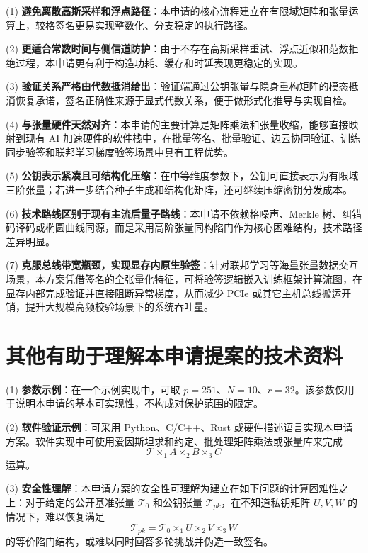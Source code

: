 \documentclass[12pt,a4paper]{article}
\begin{document}
(1) \textbf{避免离散高斯采样和浮点路径}：本申请的核心流程建立在有限域矩阵和张量运算上，较格签名更易实现整数化、分支稳定的执行路径。

(2) \textbf{更适合常数时间与侧信道防护}：由于不存在高斯采样重试、浮点近似和范数拒绝过程，本申请更有利于构造功耗、缓存和时延表现更稳定的实现。

(3) \textbf{验证关系严格由代数抵消给出}：验证端通过公钥张量与隐身重构矩阵的模态抵消恢复承诺，签名正确性来源于显式代数关系，便于做形式化推导与实现自检。

(4) \textbf{与张量硬件天然对齐}：本申请的主要计算是矩阵乘法和张量收缩，能够直接映射到现有 AI 加速硬件的软件栈中，在批量签名、批量验证、边云协同验证、训练同步验签和联邦学习梯度验签场景中具有工程优势。

(5) \textbf{公钥表示紧凑且可结构化压缩}：在中等维度参数下，公钥可直接表示为有限域三阶张量；若进一步结合种子生成和结构化矩阵，还可继续压缩密钥分发成本。

(6) \textbf{技术路线区别于现有主流后量子路线}：本申请不依赖格噪声、Merkle 树、纠错码译码或椭圆曲线同源，而是采用高阶张量同构陷门作为核心困难结构，技术路径差异明显。

(7) \textbf{克服总线带宽瓶颈，实现显存内原生验签}：针对联邦学习等海量张量数据交互场景，本方案凭借签名的全张量化特征，可将验签逻辑嵌入训练框架计算流图，在显存内部完成验证并直接阻断异常梯度，从而减少 PCIe 或其它主机总线搬运开销，提升大规模高频校验场景下的系统吞吐量。

\section{其他有助于理解本申请提案的技术资料}

(1) \textbf{参数示例}：在一个示例实现中，可取 $p=251$、$N=10$、$r=32$。该参数仅用于说明本申请的基本可实现性，不构成对保护范围的限定。

(2) \textbf{软件验证示例}：可采用 Python、C/C++、Rust 或硬件描述语言实现本申请方案。软件实现中可使用爱因斯坦求和约定、批处理矩阵乘法或张量库来完成
\[
\mathcal{T} \times_1 A \times_2 B \times_3 C
\]
运算。

(3) \textbf{安全性理解}：本申请方案的安全性可理解为建立在如下问题的计算困难性之上：对于给定的公开基准张量 $\mathcal{T}_0$ 和公钥张量 $\mathcal{T}_{pk}$，在不知道私钥矩阵 $U,V,W$ 的情况下，难以恢复满足
\[
\mathcal{T}_{pk}=\mathcal{T}_0 \times_1 U \times_2 V \times_3 W
\]
的等价陷门结构，或难以同时回答多轮挑战并伪造一致签名。
\end{document}
